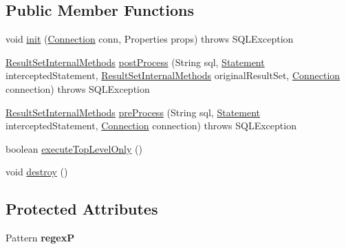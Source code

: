 \subsection*{Public Member Functions}
\begin{DoxyCompactItemize}
\item 
void \mbox{\hyperlink{classcom_1_1mysql_1_1jdbc_1_1interceptors_1_1_result_set_scanner_interceptor_a05bd31d17303e90f2933891426772f11}{init}} (\mbox{\hyperlink{interfacecom_1_1mysql_1_1jdbc_1_1_connection}{Connection}} conn, Properties props)  throws S\+Q\+L\+Exception 
\item 
\mbox{\hyperlink{interfacecom_1_1mysql_1_1jdbc_1_1_result_set_internal_methods}{Result\+Set\+Internal\+Methods}} \mbox{\hyperlink{classcom_1_1mysql_1_1jdbc_1_1interceptors_1_1_result_set_scanner_interceptor_af1b03296ceed6761576b649084580067}{post\+Process}} (String sql, \mbox{\hyperlink{interfacecom_1_1mysql_1_1jdbc_1_1_statement}{Statement}} intercepted\+Statement, \mbox{\hyperlink{interfacecom_1_1mysql_1_1jdbc_1_1_result_set_internal_methods}{Result\+Set\+Internal\+Methods}} original\+Result\+Set, \mbox{\hyperlink{interfacecom_1_1mysql_1_1jdbc_1_1_connection}{Connection}} connection)  throws S\+Q\+L\+Exception 
\item 
\mbox{\hyperlink{interfacecom_1_1mysql_1_1jdbc_1_1_result_set_internal_methods}{Result\+Set\+Internal\+Methods}} \mbox{\hyperlink{classcom_1_1mysql_1_1jdbc_1_1interceptors_1_1_result_set_scanner_interceptor_a879e6123697a092348899ea77451b747}{pre\+Process}} (String sql, \mbox{\hyperlink{interfacecom_1_1mysql_1_1jdbc_1_1_statement}{Statement}} intercepted\+Statement, \mbox{\hyperlink{interfacecom_1_1mysql_1_1jdbc_1_1_connection}{Connection}} connection)  throws S\+Q\+L\+Exception 
\item 
boolean \mbox{\hyperlink{classcom_1_1mysql_1_1jdbc_1_1interceptors_1_1_result_set_scanner_interceptor_ac0eab5cd93339b4cabf0ed35167f8e55}{execute\+Top\+Level\+Only}} ()
\item 
void \mbox{\hyperlink{classcom_1_1mysql_1_1jdbc_1_1interceptors_1_1_result_set_scanner_interceptor_af097ba3f65b6aa1713d425a06e02d14b}{destroy}} ()
\end{DoxyCompactItemize}
\subsection*{Protected Attributes}
\begin{DoxyCompactItemize}
\item 
\mbox{\label{classcom_1_1mysql_1_1jdbc_1_1interceptors_1_1_result_set_scanner_interceptor_aff8b320ec060ae7b3dd28bb005e7b2d1}} 
Pattern {\bfseries regexP}
\end{DoxyCompactItemize}


